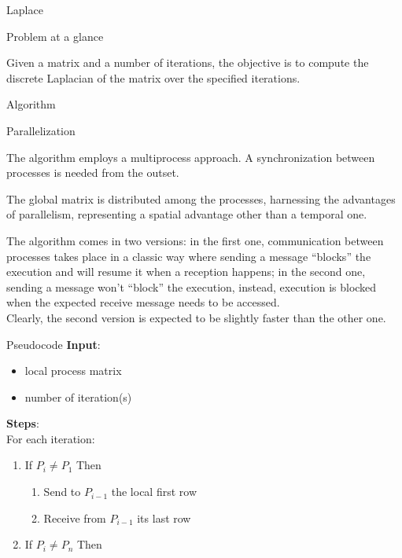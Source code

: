 \begin{chapter}{Laplace}
    \begin{section}{Problem at a glance}
        \par Given a matrix and a number of iterations, the objective is to compute the discrete Laplacian of the matrix over the specified iterations.
    \end{section}
    \begin{section}{Algorithm}
        \begin{subsection}{Parallelization}
            \par The algorithm employs a multiprocess approach. A synchronization between processes is needed from the outset.
            \par The global matrix is distributed among the processes, harnessing the advantages of parallelism, representing a spatial advantage other than a temporal one.
            \par The algorithm comes in two versions: in the first one, communication between processes takes place in a classic way where sending a message ``blocks'' the execution and will resume it when a reception happens; in the second one, sending a message won't ``block'' the execution, instead, execution is blocked when the expected receive message needs to be accessed.\\
            Clearly, the second version is expected to be slightly faster than the other one.
        \end{subsection}
        \clearpage
        \begin{subsection}{Pseudocode}
            \textbf{Input}:
            \begin{itemize}
                \item local process matrix
                \item number of iteration(s)
            \end{itemize}
            \textbf{Steps}:\\
            For each iteration:
            \begin{enumerate}
                \item If $P_i \neq P_1$ Then
                \begin{enumerate}
                    \item Send to $P_{i-1}$ the local first row
                    \item Receive from $P_{i-1}$ its last row
                \end{enumerate}
                \item If $P_i \neq P_n$ Then

\end{enumerate}
\end{subsection}
\end{section}
\end{chapter}
